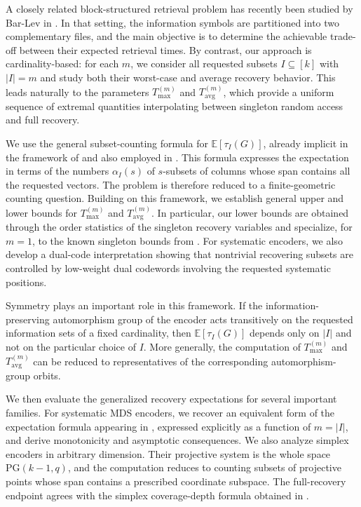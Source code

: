 \documentclass[11pt,a4paper]{article}
\numberwithin{equation}{section}
\theoremstyle{definition}
\theoremstyle{definition}
\newcommand{\PG}{\mathrm{PG}}
\newcommand{\E}{\mathbb{E}}
\newcommand{\Tmax}{T_{\max}}
\newcommand{\Tavg}{T_{\mathrm{avg}}}
\begin{document}
A closely related block-structured retrieval problem has recently been studied by Bar-Lev in \cite{BarLev2026CodedRetrieval}. In that setting, the information symbols are partitioned into two complementary files, and the main objective is to determine the achievable trade-off between their expected retrieval times. By contrast, our approach is cardinality-based: for each $m$, we consider all requested subsets $I\subseteq[k]$ with $|I|=m$ and study both their worst-case and average recovery behavior. This leads naturally to the parameters $\Tmax^{(m)}$ and $\Tavg^{(m)}$, which provide a uniform sequence of extremal quantities interpolating between singleton random access and full recovery.

We use the general subset-counting formula for $\E[\tau_I(G)]$, already implicit in the framework of \cite{gruica2024combinatorial} and also employed in \cite{BarLev2026CodedRetrieval}. This formula expresses the expectation in terms of the numbers $\alpha_I(s)$ of $s$-subsets of columns whose span contains all the requested vectors. The problem is therefore reduced to a finite-geometric counting question. Building on this framework, we establish general upper and lower bounds for $\Tmax^{(m)}$ and $\Tavg^{(m)}$. In particular, our lower bounds are obtained through the order statistics of the singleton recovery variables and specialize, for $m=1$, to the known singleton bounds from \cite{bar2024cover}. For systematic encoders, we also develop a dual-code interpretation showing that nontrivial recovering subsets are controlled by low-weight dual codewords involving the requested systematic positions.

Symmetry plays an important role in this framework. If the information-preserving automorphism group of the encoder acts transitively on the requested information sets of a fixed cardinality, then $\E[\tau_I(G)]$ depends only on $|I|$ and not on the particular choice of $I$. More generally, the computation of $\Tmax^{(m)}$ and $\Tavg^{(m)}$ can be reduced to representatives of the corresponding automorphism-group orbits.

We then evaluate the generalized recovery expectations for several important families. For systematic MDS encoders, we recover an equivalent form of the expectation formula appearing in \cite{BarLev2026CodedRetrieval}, expressed explicitly as a function of $m=|I|$, and derive monotonicity and asymptotic consequences. We also analyze simplex encoders in arbitrary dimension. Their projective system is the whole space $\PG(k-1,q)$, and the computation reduces to counting subsets of projective points whose span contains a prescribed coordinate subspace. The full-recovery endpoint agrees with the simplex coverage-depth formula obtained in \cite{bertuzzo2026duality}.
\end{document}
